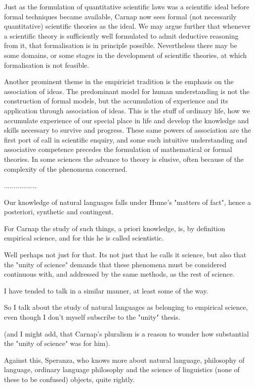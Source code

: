 \documentclass[10pt,titlepage]{book}
\begin{document}
Just as the formulation of quantitative scientific laws was a
scientific ideal before formal techniques became available, Carnap now
sees formal (not necessarily quantitative) scientific theories as the
ideal.
We may argue further that whenever a scientific theory is sufficiently
well formulated to admit deductive reasoning from it, that
formalisation is in principle possible.
Nevertheless there may be some domains, or some stages in the
development of scientific theories, at which formalisation is not
feasible.

Another prominent theme in the empiricist tradition is the emphasis on
the association of ideas.
The predominant model for human understanding is not the construction
of formal models, but the accumulation of experience and its
application through association of ideas.
This is the stuff of ordinary life, how we accumulate experience of
our special place in life and develop the knowledge and skills
necessary to survive and progress.
These same powers of association are the first port of call in
scientific enquiry, and some such intuitive understanding and
associative competence precedes the formulation of mathematical or
formal theories.
In some sciences the advance to theory is elusive, often because of
the complexity of the phenomena concerned.


.................

Our knowledge of natural languages falls under Hume's "matters of fact", hence a posteriori, synthetic and contingent.

For Carnap the study of such things, a priori knowledge, is, by definition empirical science, and for this he is called scientistic.

Well perhaps not just for that.  Its not just that he calls it science, but also that the "unity of science" demands that these phenomena must be considered continuous with, and addressed by the same methods, as the rest of science.

I have tended to talk in a similar manner, at least some of the way.

So I talk about the study of natural languages as belonging to empirical science, even though I don't myself subscribe to the "unity" thesis.

(and I might add, that Carnap's pluralism is a reason to wonder how substantial the "unity of science" was for him).

Against this, Speranza, who knows more about natural language, philosophy of language, ordinary language philosophy and the science of linguistics (none of these to be confused) objects, quite rightly.
\end{document}
